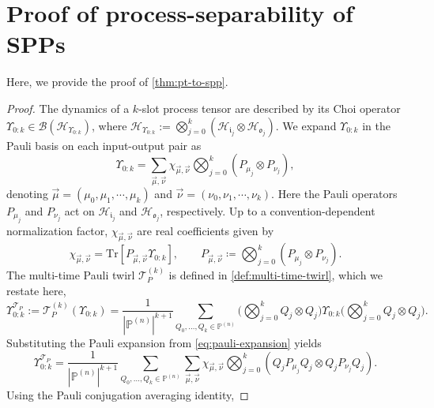 \documentclass[
    aps,
    prx,
    reprint,
    superscriptaddress,
    longbibliography,
    nofootinbib,
    floatfix,
]{revtex4-2}
\newcommand{\Tr}{\mathrm{Tr}}
\newcommand{\inp}{\mathfrak{i}}
\newcommand{\out}{\mathfrak{o}}
\begin{document}
\section{Proof of process-separability of SPPs}\label{app:proof-pt-to-spp}
Here, we provide the proof of \cref{thm:pt-to-spp}.
\begin{proof}
    The dynamics of a \(k\)-slot process tensor are described by its Choi operator \(\Upsilon_{0:k}\in\mathcal{B}(\mathcal{H}_{\Upsilon_{0:k}})\), where \(\mathcal{H}_{\Upsilon_{0:k}}:=\bigotimes_{j=0}^k(\mathcal{H}_{\inp_j}\otimes\mathcal{H}_{\out_j})\). We expand \(\Upsilon_{0:k}\) in the Pauli basis on each input-output pair as
    \begin{equation}\label{eq:pauli-expansion}
        \Upsilon_{0:k} = \sum_{\vec{\mu},\vec{\nu}} \chi_{\vec{\mu},\vec{\nu}} \bigotimes_{j=0}^k (P_{\mu_j}\otimes P_{\nu_j}),
    \end{equation}
    denoting \(\vec{\mu} = (\mu_0,\mu_1,\cdots,\mu_k)\) and \(\vec{\nu} = (\nu_0,\nu_1,\cdots,\nu_k)\). Here the Pauli operators \(P_{\mu_j}\) and \(P_{\nu_j}\) act on \(\mathcal{H}_{\inp_j}\) and \(\mathcal{H}_{\out_j}\), respectively. Up to a convention-dependent normalization factor, \(\chi_{\vec{\mu},\vec{\nu}}\) are real coefficients given by
    \begin{equation}
        \chi_{\vec{\mu},\vec{\nu}} = \Tr\left[P_{\vec{\mu},\vec{\nu}}\Upsilon_{0:k}\right], 
        \qquad
        P_{\vec{\mu},\vec{\nu}} \coloneq \bigotimes_{j=0}^k (P_{\mu_j}\otimes P_{\nu_j}).
    \end{equation}
    The multi-time Pauli twirl \(\mathcal{T}_P^{(k)}\) is defined in \cref{def:multi-time-twirl}, which we restate here,
    \begin{equation}
        \Upsilon_{0:k}^{\mathcal{T}_P} := \mathcal{T}_P^{(k)}(\Upsilon_{0:k}) = \frac{1}{|\mathbb{P}^{(n)}|^{k+1}} \sum_{Q_0,\dots,Q_k\in\mathbb{P}^{(n)}} \bigg(\bigotimes_{j=0}^k Q_j\otimes Q_j\bigg) \Upsilon_{0:k} \bigg(\bigotimes_{j=0}^k Q_j\otimes Q_j\bigg).
    \end{equation}
    Substituting the Pauli expansion from \cref{eq:pauli-expansion} yields
    \begin{equation}\label{eq:pauli-sub}
        \Upsilon_{0:k}^{\mathcal{T}_P} = \frac{1}{|\mathbb{P}^{(n)}|^{k+1}} \sum_{Q_0,\dots,Q_k\in\mathbb{P}^{(n)}} \sum_{\vec{\mu},\vec{\nu}} \chi_{\vec{\mu},\vec{\nu}} \bigotimes_{j=0}^k (Q_j P_{\mu_j} Q_j \otimes Q_j P_{\nu_j} Q_j).
    \end{equation}
    Using the Pauli conjugation averaging identity,

\end{proof}
\end{document}
